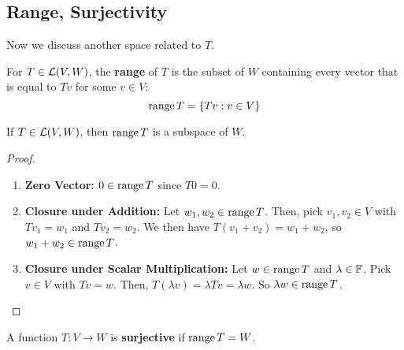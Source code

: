 \subsection*{Range, Surjectivity}
Now we discuss another space related to $T$.
\begin{definition}[Range]
    For $T\in \mathcal{L}(V,W)$, the \textbf{range} of $T$ is the subset of $W$ containing every vector that is equal to $Tv$ for some $v\in V$:
    \[ \operatorname{range} T = \{ Tv: v\in V\}\]
\end{definition}
\begin{theorem}
    If $T\in\mathcal{L}(V,W)$, then $\operatorname{range} T$ is a subspace of $W$.
\end{theorem}
\begin{proof}
    \begin{enumerate}
        \item \textbf{Zero Vector:} $0\in \operatorname{range} T$ since $T0 = 0$. 
        \item \textbf{Closure under Addition:} Let $w_1, w_2 \in \operatorname{range} T$. Then, pick $v_1,v_2\in V$ with $Tv_1 = w_1$ and $Tv_2=w_2$. We then have $T(v_1+v_2) = w_1+w_2$, so $w_1+w_2 \in \operatorname{range} T$.
        \item \textbf{Closure under Scalar Multiplication:} Let $w\in \operatorname{range} T$ and $\lambda\in\mathbb F$. Pick $v\in V$ with $Tv = w$. Then, $T(\lambda v) = \lambda Tv = \lambda w$. So $\lambda w\in \operatorname{range} T$. 
    \end{enumerate}
\end{proof}
\begin{definition}[Surjective]
    A function $T: V\to W$ is \textbf{surjective} if $\operatorname{range} T = W$.
\end{definition}
